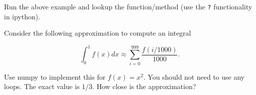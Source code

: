 \begin{exercise}
Run the above example and lookup the  function/method (use the \texttt{?} functionality in ipython).
\end{exercise}


\begin{exercise}
Consider the following approximation to compute an integral

\[
\int_0^{1} f(x)dx \approx \sum_{i = 0}^{999} \frac{f(i/1000)}{1000}.
\]

Use numpy to implement this for $f(x) = x^2$. You should not need to use any
loops. The exact value is $1/3$. How close is the approximation?
\end{exercise}



% 
% 
% 
% 
% 
% 
% 
% 
% 
% 
% 
